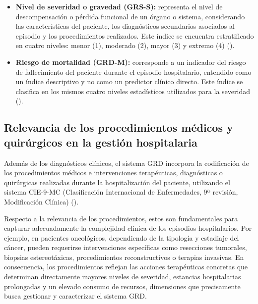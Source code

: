 \begin{itemize}
	\item \textbf{Nivel de severidad o gravedad (GRS-S):} representa el nivel de descompensación o pérdida funcional de un órgano o sistema, considerando las características del paciente, los diagnósticos secundarios asociados al episodio y los procedimientos realizados. Este índice se encuentra estratificado en cuatro niveles: menor (1), moderado (2), mayor (3) y extremo (4) (\cite{revista_socampar}).
	\item \textbf{Riesgo de mortalidad (GRD-M):} corresponde a un indicador del riesgo de fallecimiento del paciente durante el episodio hospitalario, entendido como un índice descriptivo y no como un predictor clínico directo. Este índice se clasifica en los mismos cuatro niveles estadísticos utilizados para la severidad (\cite{revista_socampar}).
\end{itemize}


\subsection{Relevancia de los procedimientos médicos y quirúrgicos en la gestión hospitalaria}

Además de los diagnósticos clínicos, el sistema GRD incorpora la codificación de los procedimientos médicos e intervenciones terapéuticas, diagnósticas o quirúrgicas realizadas durante la hospitalización del paciente, utilizando el sistema CIE-9-MC (Clasificación Internacional de Enfermedades, 9ª revisión, Modificación Clínica) (\cite{minsal2024_procedimientos}).

Respecto a la relevancia de los procedimientos, estos son fundamentales para capturar adecuadamente la complejidad clínica de los episodios hospitalarios. Por ejemplo, en pacientes oncológicos, dependiendo de la tipología y estadiaje del cáncer, pueden requerirse intervenciones específicas como resecciones tumorales, biopsias estereotáxicas, procedimientos reconstructivos o terapias invasivas. En consecuencia, los procedimientos reflejan las acciones terapéuticas concretas que determinan directamente mayores niveles de severidad, estancias hospitalarias prolongadas y un elevado consumo de recursos, dimensiones que precisamente busca gestionar y caracterizar el sistema GRD.

